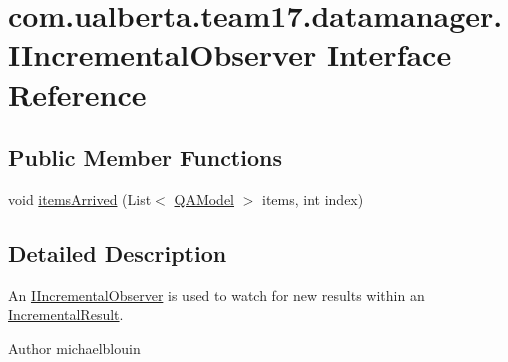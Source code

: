 \hypertarget{interfacecom_1_1ualberta_1_1team17_1_1datamanager_1_1_i_incremental_observer}{\section{com.\+ualberta.\+team17.\+datamanager.\+I\+Incremental\+Observer Interface Reference}
\label{interfacecom_1_1ualberta_1_1team17_1_1datamanager_1_1_i_incremental_observer}
}
\subsection*{Public Member Functions}
\begin{DoxyCompactItemize}
\item 
void \hyperlink{interfacecom_1_1ualberta_1_1team17_1_1datamanager_1_1_i_incremental_observer_a5dc14706bd2a999bd462b2ad71e034c4}{items\+Arrived} (List$<$ \hyperlink{classcom_1_1ualberta_1_1team17_1_1_q_a_model}{Q\+A\+Model} $>$ items, int index)
\end{DoxyCompactItemize}


\subsection{Detailed Description}
An \hyperlink{interfacecom_1_1ualberta_1_1team17_1_1datamanager_1_1_i_incremental_observer}{I\+Incremental\+Observer} is used to watch for new results within an \hyperlink{classcom_1_1ualberta_1_1team17_1_1datamanager_1_1_incremental_result}{Incremental\+Result}.

\begin{DoxyAuthor}{Author}
michaelblouin 
\end{DoxyAuthor}


